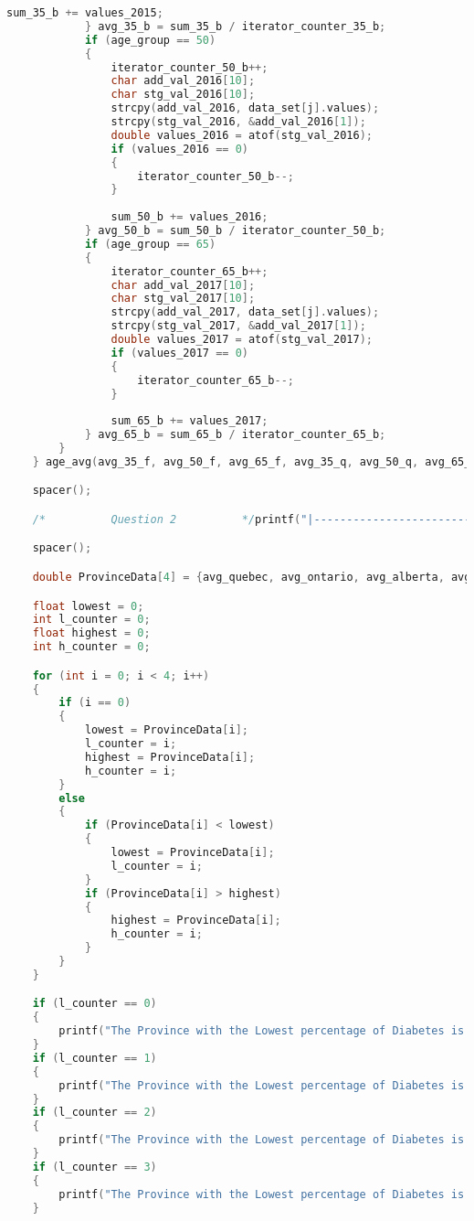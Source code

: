 \begin{lstlisting}[language=C, caption=\textit{CPS 188 Term Project Source Code}]
				sum_35_b += values_2015;
			} avg_35_b = sum_35_b / iterator_counter_35_b;
			if (age_group == 50)
			{
				iterator_counter_50_b++;
				char add_val_2016[10];
				char stg_val_2016[10];
				strcpy(add_val_2016, data_set[j].values);
				strcpy(stg_val_2016, &add_val_2016[1]);
				double values_2016 = atof(stg_val_2016);
				if (values_2016 == 0)
				{
					iterator_counter_50_b--;
				}
				
				sum_50_b += values_2016;
			} avg_50_b = sum_50_b / iterator_counter_50_b;
			if (age_group == 65)
			{
				iterator_counter_65_b++;
				char add_val_2017[10];
				char stg_val_2017[10];
				strcpy(add_val_2017, data_set[j].values);
				strcpy(stg_val_2017, &add_val_2017[1]);
				double values_2017 = atof(stg_val_2017);
				if (values_2017 == 0)
				{
					iterator_counter_65_b--;
				}
				
				sum_65_b += values_2017;
			} avg_65_b = sum_65_b / iterator_counter_65_b;
		}
    } age_avg(avg_35_f, avg_50_f, avg_65_f, avg_35_q, avg_50_q, avg_65_q, avg_35_o, avg_50_o, avg_65_o, avg_35_a, avg_50_a, avg_65_a, avg_35_b, avg_50_b, avg_65_b);

	spacer();

	/*          Question 2          */printf("|------------------------------------------------------------------------------------------Question 2------------------------------------------------------------------------------------------|\n");

	spacer();

	double ProvinceData[4] = {avg_quebec, avg_ontario, avg_alberta, avg_british_columbia};

	float lowest = 0;
	int l_counter = 0;
	float highest = 0;
	int h_counter = 0;

	for (int i = 0; i < 4; i++)
	{
		if (i == 0)
		{
			lowest = ProvinceData[i];
			l_counter = i;
			highest = ProvinceData[i];
			h_counter = i;
		}
		else
		{
			if (ProvinceData[i] < lowest)
			{
				lowest = ProvinceData[i];
				l_counter = i;
			}
			if (ProvinceData[i] > highest)
			{
				highest = ProvinceData[i];
				h_counter = i;
			}
		}
	}

	if (l_counter == 0)
	{
		printf("The Province with the Lowest percentage of Diabetes is Quebec\n");
	}
	if (l_counter == 1)
	{
		printf("The Province with the Lowest percentage of Diabetes is Ontario\n");
	}
	if (l_counter == 2)
	{
		printf("The Province with the Lowest percentage of Diabetes is Alberta\n");
	}
	if (l_counter == 3)
	{
		printf("The Province with the Lowest percentage of Diabetes is British Columbia\n");
	}


\end{lstlisting}
